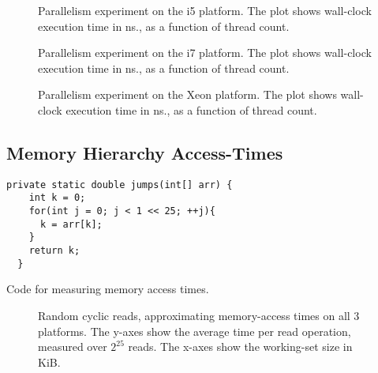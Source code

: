 \begin{figure}[hbpt]
\graphicspath{{plots/}}

	\caption{Parallelism experiment on the i5 platform. The plot shows
	wall-clock execution time in ns., as a function of thread count.}
	\label{fig:parallel-i5}
\end{figure}

\begin{figure}[hbpt]
\graphicspath{{plots/}}

	\caption{Parallelism experiment on the i7 platform. The plot shows
	wall-clock execution time in ns., as a function of thread count.}
	\label{fig:parallel-i7}
\end{figure}

\begin{figure}[hbpt]
\graphicspath{{plots/}}

	\caption{Parallelism experiment on the Xeon platform. The plot shows
	wall-clock execution time in ns., as a function of thread count.}
	\label{fig:parallel-xeon}
\end{figure}

\subsection{Memory Hierarchy Access-Times}
\begin{code}
\begin{Verbatim}[frame=single]
  private static double jumps(int[] arr) {
    int k = 0;
    for(int j = 0; j < 1 << 25; ++j){
      k = arr[k];
    }
    return k;
  }
\end{Verbatim}
	\caption{Code for measuring memory access times.}
\end{code}

\begin{figure}[hbpt]
	\graphicspath{{plots/}}
	\begin{subfigure}{1\textwidth}
		
	\end{subfigure}
	\begin{subfigure}{1\textwidth}
		
	\end{subfigure}
	\begin{subfigure}{1\textwidth}
		
	\end{subfigure}
	\caption{Random cyclic reads, approximating memory-access times on all 3
	platforms. The y-axes show the average time per read operation, measured
	over $2^{25}$ reads. The x-axes show the working-set size in KiB.}
	\label{fig:readtimes}
\end{figure}

